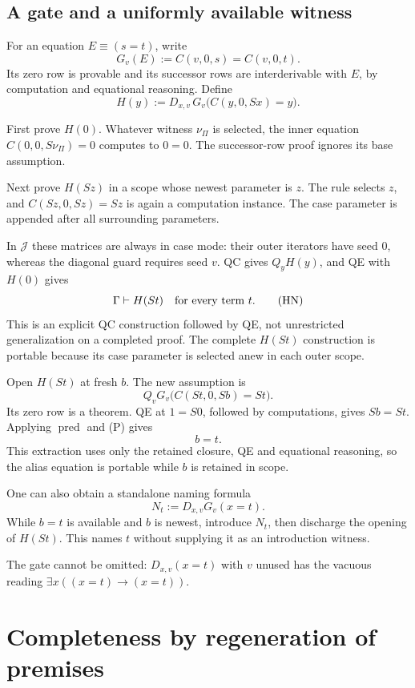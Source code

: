 \documentclass[11pt]{article}
\newcommand{\Jcal}{\mathcal J}
\newcommand{\pred}{\operatorname{pred}}
\newcommand{\newest}{\nu_{\Pi}}
\begin{document}
\subsection{A gate and a uniformly available witness}

For an equation \(E\equiv(s=t)\), write
\[
 G_v(E):=C(v,0,s)=C(v,0,t).
\]
Its zero row is provable and its successor rows are interderivable with
\(E\), by computation and equational reasoning. Define
\[
 H(y):=D_{x,v}\,G_v\bigl(C(y,0,Sx)=y\bigr).
 \tag{H}
\]

First prove \(H(0)\). Whatever witness \(\newest\) is selected,
the inner equation \(C(0,0,S\newest)=0\) computes to \(0=0\).
The successor-row proof ignores its base assumption.

Next prove \(H(Sz)\) in a scope whose newest parameter is \(z\).
The rule selects \(z\), and \(C(Sz,0,Sz)=Sz\) is again a computation
instance. The case parameter is appended after all surrounding parameters.

In \(\Jcal\) these matrices are always in case mode: their outer iterators
have seed \(0\), whereas the diagonal guard requires seed \(v\).
QC gives \(Q_yH(y)\), and QE with \(H(0)\) gives
\[
 \Gamma\vdash H(St)\quad\hbox{for every term }t.
 \tag{HN}
\]
This is an explicit QC construction followed by QE, not unrestricted
generalization on a completed proof. The complete \(H(St)\) construction
is portable because its case parameter is selected anew in each outer scope.

Open \(H(St)\) at fresh \(b\). The new assumption is
\[
 Q_vG_v\bigl(C(St,0,Sb)=St\bigr).
\]
Its zero row is a theorem. QE at \(1=S0\), followed by computations,
gives \(Sb=St\). Applying \(\pred\) and (P) gives
\[
 b=t. \tag{Alias}
\]
This extraction uses only the retained closure, QE and equational reasoning,
so the alias equation is portable while \(b\) is retained in scope.

One can also obtain a standalone naming formula
\[
 N_t:=D_{x,v}G_v(x=t).
\]
While \(b=t\) is available and \(b\) is newest, introduce \(N_t\), then
discharge the opening of \(H(St)\). This names \(t\) without supplying it
as an introduction witness.

The gate cannot be omitted: \(D_{x,v}(x=t)\) with \(v\) unused has the
vacuous reading \(\exists x((x=t)\to(x=t))\).

\section{Completeness by regeneration of premises}\label{sec:compiler}
\end{document}
